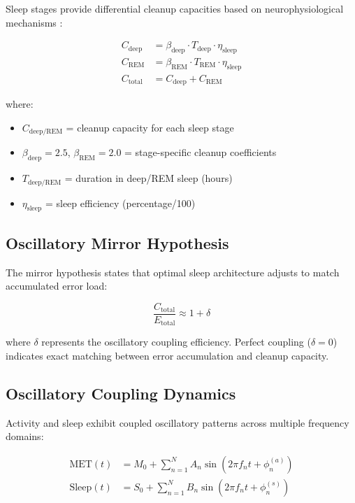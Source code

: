 \documentclass[12pt]{article}
\begin{document}
Sleep stages provide differential cleanup capacities based on neurophysiological mechanisms \citep{kang2013amyloid, fultz2019coupled}:

\begin{align}
C_{\text{deep}} &= \beta_{\text{deep}} \cdot T_{\text{deep}} \cdot \eta_{\text{sleep}} \\
C_{\text{REM}} &= \beta_{\text{REM}} \cdot T_{\text{REM}} \cdot \eta_{\text{sleep}} \\
C_{\text{total}} &= C_{\text{deep}} + C_{\text{REM}}
\label{eq:cleanup_capacity}
\end{align}

where:
\begin{itemize}
\item $C_{\text{deep/REM}}$ = cleanup capacity for each sleep stage
\item $\beta_{\text{deep}} = 2.5$, $\beta_{\text{REM}} = 2.0$ = stage-specific cleanup coefficients
\item $T_{\text{deep/REM}}$ = duration in deep/REM sleep (hours)
\item $\eta_{\text{sleep}}$ = sleep efficiency (percentage/100)
\end{itemize}

\subsection{Oscillatory Mirror Hypothesis}

The mirror hypothesis states that optimal sleep architecture adjusts to match accumulated error load:

\begin{equation}
\frac{C_{\text{total}}}{E_{\text{total}}} \approx 1 + \delta
\label{eq:mirror_coefficient}
\end{equation}

where $\delta$ represents the oscillatory coupling efficiency. Perfect coupling ($\delta = 0$) indicates exact matching between error accumulation and cleanup capacity.

\subsection{Oscillatory Coupling Dynamics}

Activity and sleep exhibit coupled oscillatory patterns across multiple frequency domains:

\begin{align}
\text{MET}(t) &= M_0 + \sum_{n=1}^{N} A_n \sin(2\pi f_n t + \phi_n^{(a)}) \\
\text{Sleep}(t) &= S_0 + \sum_{n=1}^{N} B_n \sin(2\pi f_n t + \phi_n^{(s)})
\label{eq:oscillatory_coupling}
\end{align}
\end{document}
